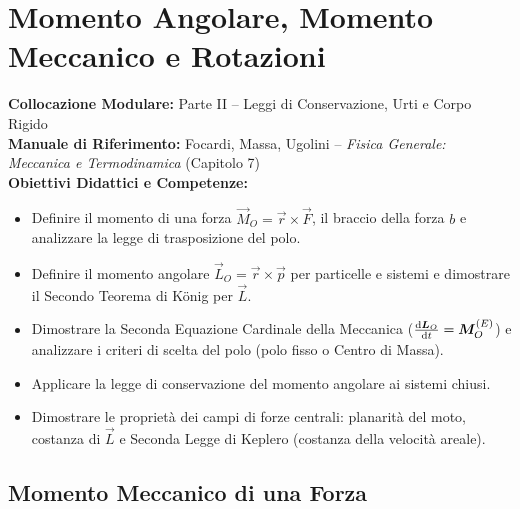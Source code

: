 \chapter{Momento Angolare, Momento Meccanico e Rotazioni}
\label{chap:momento_angolare_rotazione}

\begin{tcolorbox}[enhanced, breakable, colback=navyblue!4!white, colframe=navyblue!80!black,
    coltitle=white, fonttitle=\bfseries\sffamily, title={Quadro Sinottico del Capitolo 07},
    sharp corners, rounded corners=south, boxrule=1pt]
\textbf{Collocazione Modulare:} Parte II -- Leggi di Conservazione, Urti e Corpo Rigido\\
\textbf{Manuale di Riferimento:} Focardi, Massa, Ugolini -- \emph{Fisica Generale: Meccanica e Termodinamica} (Capitolo 7)\\
\textbf{Obiettivi Didattici e Competenze:}\par
\begin{itemize}
    \item Definire il momento di una forza $\vec{M}_O = \vec{r}\times\vec{F}$, il braccio della forza $b$ e analizzare la legge di trasposizione del polo.
    \item Definire il momento angolare $\vec{L}_O = \vec{r}\times\vec{p}$ per particelle e sistemi e dimostrare il Secondo Teorema di König per $\vec{L}$.
    \item Dimostrare la Seconda Equazione Cardinale della Meccanica ($\frac{\mathrm{d} \bm{L}_O}{\mathrm{d} t} = \bm{M}_O^{(E)}$) e analizzare i criteri di scelta del polo (polo fisso o Centro di Massa).
    \item Applicare la legge di conservazione del momento angolare ai sistemi chiusi.
    \item Dimostrare le proprietà dei campi di forze centrali: planarità del moto, costanza di $\vec{L}$ e Seconda Legge di Keplero (costanza della velocità areale).
\end{itemize}
\end{tcolorbox}

\vspace{0.5em}

\section{Momento Meccanico di una Forza}
\label{sec:momento_forza}

